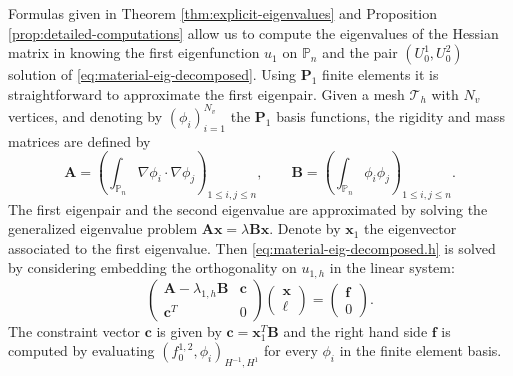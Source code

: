 \documentclass[JEP,XML,SOM,Unicode,ThmDefs,NoFloatCountersInSection,published]{cedram}
\theoremstyle{plain}
\theoremstyle{definition}
\newcommand{\bo}[1]{{\boldsymbol#1}}
\let\Bbb\mathbb
\begin{document}
Formulas given in Theorem \ref{thm:explicit-eigenvalues} and Proposition \ref{prop:detailed-computations} allow us to compute the eigenvalues of the Hessian matrix in knowing the first eigenfunction $u_1$ on $\Bbb{P}_n$ and the pair $(U_0^1,U_0^2)$ solution of \eqref{eq:material-eig-decomposed}. Using ${\bo P_1}$ finite elements it is straightforward to approximate the first eigenpair. Given a mesh $\mathcal T_h$ with $N_v$ vertices, and denoting by $(\phi_i)_{i=1}^{N_v}$ the ${\bo P_1}$ basis functions, the rigidity and mass matrices are defined by
\[
\bo A = \left(\int_{\Bbb P_n} \nabla \phi_i \cdot \nabla \phi_j\right)_{1\leq i,j\leq n},\qquad \bo B = \left(\int_{\Bbb P_n} \phi_i \phi_j\right)_{1\leq i,j\leq n}.
\]
The first eigenpair and the second eigenvalue are approximated by solving the generalized eigenvalue problem $\bo A \bo x = \lambda \bo B \bo x$. Denote by $\bo x_1$ the eigenvector associated to the first eigenvalue. Then \eqref{eq:material-eig-decomposed.h} is solved by considering embedding the orthogonality on $u_{1,h}$ in the linear system:
\[
\begin{pmatrix}
\bo A - \lambda_{1,h} \bo B & \bo c \\
\bo c^T & 0
\end{pmatrix}
\begin{pmatrix}
\bo x \\ \ell
\end{pmatrix}
= \begin{pmatrix}
\bo f \\
0
\end{pmatrix}.
\]
The constraint vector $\bo c$ is given by $\bo c = \bo x_1^T \bo B$ and the right hand side $\bo f$ is computed by evaluating $(f_0^{1,2},\phi_i)_{H^{-1},H^1}$ for every $\phi_i$ in the finite element basis.
\end{document}
